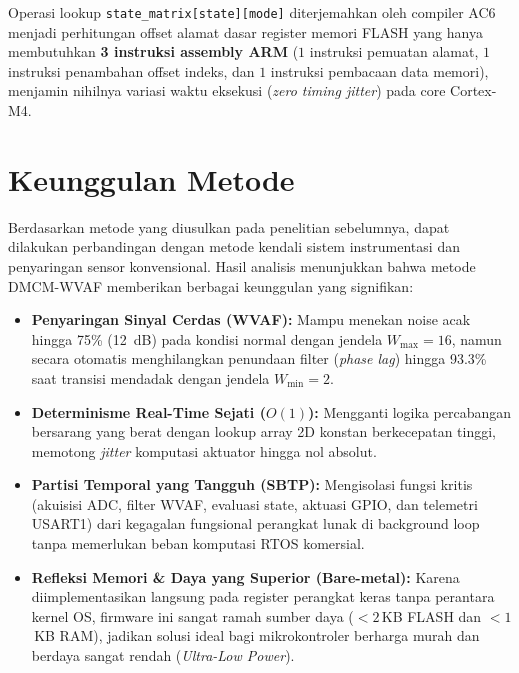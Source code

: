 \documentclass[11pt,a4paper]{article}
\begin{document}
\begin{longtable}
Operasi lookup \texttt{state\_matrix[state][mode]} diterjemahkan oleh compiler AC6 menjadi perhitungan offset alamat dasar register memori FLASH yang hanya membutuhkan \textbf{3 instruksi assembly ARM} ($1$ instruksi pemuatan alamat, $1$ instruksi penambahan offset indeks, dan $1$ instruksi pembacaan data memori), menjamin nihilnya variasi waktu eksekusi (\textit{zero timing jitter}) pada core Cortex-M4.

\section{Keunggulan Metode}
\hspace{1.5em}Berdasarkan metode yang diusulkan pada penelitian sebelumnya, dapat dilakukan perbandingan dengan metode kendali sistem instrumentasi dan penyaringan sensor konvensional. Hasil analisis menunjukkan bahwa metode DMCM-WVAF memberikan berbagai keunggulan yang signifikan:
\begin{itemize}
    \item \textbf{Penyaringan Sinyal Cerdas (WVAF):} Mampu menekan noise acak hingga 75\% (12~dB) pada kondisi normal dengan jendela $W_{\max}=16$, namun secara otomatis menghilangkan penundaan filter (\textit{phase lag}) hingga 93.3\% saat transisi mendadak dengan jendela $W_{\min}=2$.
    \item \textbf{Determinisme Real-Time Sejati ($O(1)$):} Mengganti logika percabangan bersarang yang berat dengan lookup array 2D konstan berkecepatan tinggi, memotong \textit{jitter} komputasi aktuator hingga nol absolut.
    \item \textbf{Partisi Temporal yang Tangguh (SBTP):} Mengisolasi fungsi kritis (akuisisi ADC, filter WVAF, evaluasi state, aktuasi GPIO, dan telemetri USART1) dari kegagalan fungsional perangkat lunak di background loop tanpa memerlukan beban komputasi RTOS komersial.
    \item \textbf{Refleksi Memori \& Daya yang Superior (Bare-metal):} Karena diimplementasikan langsung pada register perangkat keras tanpa perantara kernel OS, firmware ini sangat ramah sumber daya ($< 2$\,KB FLASH dan $< 1$\,KB RAM), jadikan solusi ideal bagi mikrokontroler berharga murah dan berdaya sangat rendah (\textit{Ultra-Low Power}).
\end{itemize}


\end{longtable}
\end{document}
